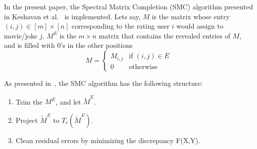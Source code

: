 In the present paper, the Spectral Matrix Completion (SMC) algorithm presented in Keshavan et al.~\cite{keshavan2010matrix} is implemented. Lets say, $M$ is the matrix whose entry $(i,j) \in [m] \times [n]$ corresponding to the rating user $i$ would assign to movie/joke $j$. $M^E$ is the $m \times n$ matrix that contains the revealed entries of $M$, and is filled with 0's in the other positions 
\begin{equation}
M = \left \{ \begin{array}{rcl}
	M_{i,j} & \mbox{if  }  (i,j) \in E \\
	 0 & \mbox{otherwise} 
	\end{array} \right.
\end{equation}

As presented in~\cite{keshavan2010matrix}, the SMC algorithm has the following structure:
\begin{enumerate}
\item Trim the $M^E$, and let $\widetilde{M}^E$.
\item Project $\widetilde{M}^E$ to $T_r(\widetilde{M}^E)$.
\item Clean residual errors by minimizing the discrepancy F(X,Y).
\end{enumerate}



